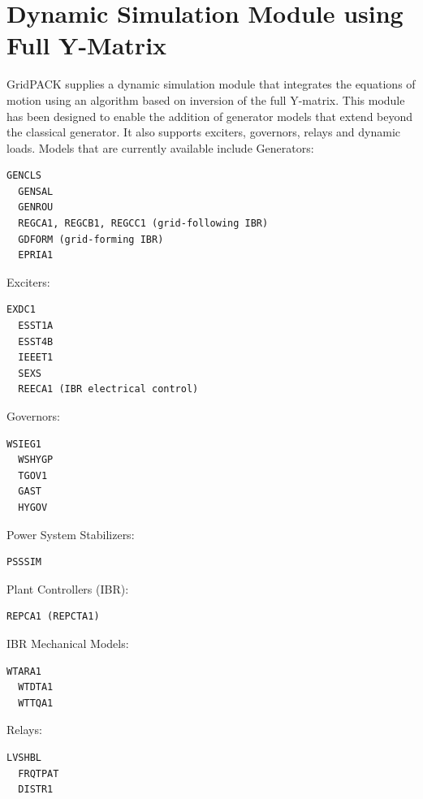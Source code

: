 \section{Dynamic Simulation Module using Full Y-Matrix}

GridPACK supplies a dynamic simulation module that integrates the equations of motion using an algorithm based on inversion of the full Y-matrix. This module has been designed to enable the addition of generator models that extend beyond the classical generator. It also supports exciters, governors, relays and dynamic loads. Models that are currently available include
Generators:

{
\color{red}
\begin{Verbatim}[fontseries=b]
  GENCLS
  GENSAL
  GENROU
  REGCA1, REGCB1, REGCC1 (grid-following IBR)
  GDFORM (grid-forming IBR)
  EPRIA1
\end{Verbatim}
}

Exciters:

{
\color{red}
\begin{Verbatim}[fontseries=b]
  EXDC1
  ESST1A
  ESST4B
  IEEET1
  SEXS
  REECA1 (IBR electrical control)
\end{Verbatim}
}

Governors:

{
\color{red}
\begin{Verbatim}[fontseries=b]
  WSIEG1
  WSHYGP
  TGOV1
  GAST
  HYGOV
\end{Verbatim}
}

Power System Stabilizers:

{
\color{red}
\begin{Verbatim}[fontseries=b]
  PSSSIM
\end{Verbatim}
}

Plant Controllers (IBR):

{
\color{red}
\begin{Verbatim}[fontseries=b]
  REPCA1 (REPCTA1)
\end{Verbatim}
}

IBR Mechanical Models:

{
\color{red}
\begin{Verbatim}[fontseries=b]
  WTARA1
  WTDTA1
  WTTQA1
\end{Verbatim}
}

Relays:

{
\color{red}
\begin{Verbatim}[fontseries=b]
  LVSHBL
  FRQTPAT
  DISTR1
\end{Verbatim}
}

